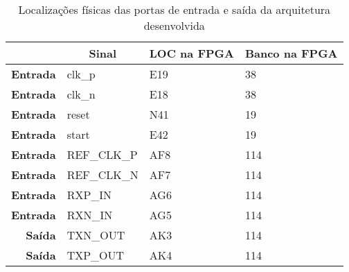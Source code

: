 \begin{table}[h!]
	\centering
		\caption[Localizações físicas das portas de entrada e saída da arquitetura desenvolvida]{Localizações físicas das portas de entrada e saída da arquitetura desenvolvida}
	\label{table:loc_planD_simples}
		\begin{tabular}{rlll}
			\hline
			\multicolumn{1}{l}{}                  & \multicolumn{1}{c}{\textbf{Sinal}} & \multicolumn{1}{c}{\textbf{LOC na FPGA}} & \multicolumn{1}{c}{\textbf{Banco na FPGA}} \\ \hline
			\multicolumn{1}{r|}{\textbf{Entrada}} & clk\_p                             & E19                                      & 38                                         \\
			\multicolumn{1}{r|}{\textbf{Entrada}} & clk\_n                             & E18                                      & 38                                         \\
			\multicolumn{1}{r|}{\textbf{Entrada}} & reset                              & N41                                      & 19                                         \\
			\multicolumn{1}{r|}{\textbf{Entrada}} & start                              & E42                                      & 19                                         \\
			\multicolumn{1}{r|}{\textbf{Entrada}} & REF\_CLK\_P                        & AF8                                      & 114                                        \\
			\multicolumn{1}{r|}{\textbf{Entrada}} & REF\_CLK\_N                        & AF7                                      & 114                                        \\
			\multicolumn{1}{r|}{\textbf{Entrada}} & RXP\_IN                            & AG6                                      & 114                                        \\
			\multicolumn{1}{r|}{\textbf{Entrada}} & RXN\_IN                            & AG5                                      & 114                                        \\
			\multicolumn{1}{r|}{\textbf{Saída}}   & TXN\_OUT                           & AK3                                      & 114                                        \\
			\multicolumn{1}{r|}{\textbf{Saída}}   & TXP\_OUT                           & AK4                                      & 114                                        \\

\end{tabular}
\end{table}
